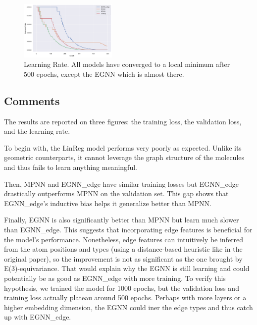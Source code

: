 \documentclass[sigconf]{acmart}
\begin{document}
\begin{figure}
    \centering
    \includegraphics[width=0.42\textwidth]{figures/learning_rate.png}
    \caption{Learning Rate. All models have converged to a local minimum after 500 epochs, except the EGNN which is almost there.}
    \label{fig:learning-rate}
\end{figure}

\subsection{Comments}
The results are reported on three figures: the training loss, the validation loss, and the learning rate.

To begin with, the LinReg model performs very poorly as expected. Unlike its geometric counterparts, it cannot leverage the graph structure of the molecules and thus fails to learn anything meaningful.

Then, MPNN and EGNN\_edge have similar training losses but EGNN\_edge drastically outperforms MPNN on the validation set. This gap shows that EGNN\_edge's inductive bias helps it generalize better than MPNN.

Finally, EGNN is also significantly better than MPNN but learn much slower than EGNN\_edge. This suggests that incorporating edge features is beneficial for the model's performance.
Nonetheless, edge features can intuitively be inferred from the atom positions and types (using a distance-based heuristic like in the original paper), so the improvement is not as significant as the one brought by E(3)-equivariance.
That would explain why the EGNN is still learning and could potentially be as good as EGNN\_edge with more training. To verify this hypothesis, we trained the model for 1000 epochs, but the validation loss and training loss actually plateau around 500 epochs.
Perhaps with more layers or a higher embedding dimension, the EGNN could iner the edge types and thus catch up with EGNN\_edge.




\end{document}
